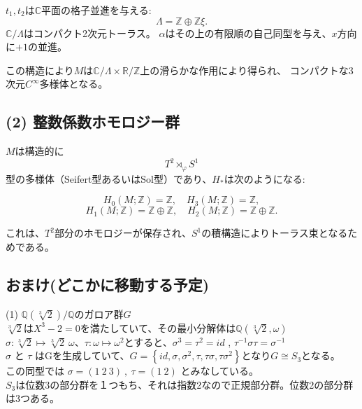 \documentclass[11pt]{article}
\begin{document}
$t_1,t_2$は$\mathbb{C}$平面の格子並進を与える:
\[
\Lambda=\mathbb{Z}\oplus\mathbb{Z}\xi.
\]
$\mathbb{C}/\Lambda$はコンパクト2次元トーラス。
$\alpha$はその上の有限順の自己同型を与え、$x$方向に$+1$の並進。

この構造により$M$は$\mathbb{C}/\Lambda \times \mathbb{R}/\mathbb{Z}$上の滑らかな作用により得られ、
コンパクトな3次元$C^\infty$多様体となる。

\subsection*{(2) 整数係数ホモロジー群}

$M$は構造的に
\[
T^2\rtimes_\varphi S^1
\]
型の多様体（Seifert型あるいはSol型）であり、$H_*$は次のようになる:

\[
H_0(M;\mathbb{Z})=\mathbb{Z},
\quad
H_3(M;\mathbb{Z})=\mathbb{Z},
\]
\[
H_1(M;\mathbb{Z})=\mathbb{Z}\oplus \mathbb{Z},
\quad
H_2(M;\mathbb{Z})=\mathbb{Z}\oplus \mathbb{Z}.
\]

これは、$T^2$部分のホモロジーが保存され、$S^1$の積構造によりトーラス束となるためである。

\newpage

\subsection*{おまけ(どこかに移動する予定)}
(1) $\mathbb{Q}(\sqrt[3]{2}) / \mathbb{Q}$のガロア群$G$\\
$\sqrt[3]{2}$は$X^3 -2=0$を満たしていて、その最小分解体は$\mathbb{Q}(\sqrt[3]{2},\omega)$\\
$\sigma : \sqrt[3]{2} \mapsto \sqrt[3]{2} \ \omega$、$\tau : \omega \mapsto \omega^2$とすると、$\sigma^3 = \tau^2 = id$ , $\tau^{-1} \sigma \tau = \sigma^{-1}$\\
$\sigma$ と $\tau$ はGを生成していて、$G=\left\{ id, \sigma, \sigma^2 , \tau , \tau \sigma , \tau \sigma^2 \right\}$となり$G \cong S_3$となる。\\
この同型では $\sigma=(1\ 2\ 3)\ ,\ \tau=(1\ 2)$ とみなしている。\\
$S_3$は位数3の部分群を１つもち、それは指数2なので正規部分群。位数2の部分群は3つある。\\
\end{document}
